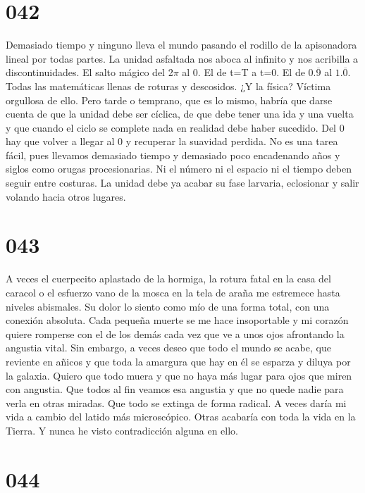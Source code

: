\documentclass[a4paper,11pt,openright,twocolumn]{book}
\begin{document}
\section*{042}

Demasiado tiempo y ninguno lleva el mundo pasando el rodillo de la apisonadora lineal por todas partes. La unidad asfaltada nos aboca al infinito y nos acribilla a discontinuidades. El salto mágico del 2\(\pi\) al 0. El de t=T a t=0. El de \(0.\overline{9}\) al \(1.\overline{0}\). Todas las matemáticas llenas de roturas y descosidos. ¿Y la física? Víctima orgullosa de ello. Pero tarde o temprano, que es lo mismo, habría que darse cuenta de que la unidad debe ser cíclica, de que debe tener una ida y una vuelta y que cuando el ciclo se complete nada en realidad debe haber sucedido. Del 0 hay que volver a llegar al 0 y recuperar la suavidad perdida. No es una tarea fácil, pues llevamos demasiado tiempo y demasiado poco encadenando años y siglos como orugas procesionarias. Ni el número ni el espacio ni el tiempo deben seguir entre costuras. La unidad debe ya acabar su fase larvaria, eclosionar y salir volando hacia otros lugares.

\section*{043}

A veces el cuerpecito aplastado de la hormiga, la rotura fatal en la casa del caracol o el esfuerzo vano de la mosca en la tela de araña me estremece hasta niveles abismales. Su dolor lo siento como mío de una forma total, con una conexión absoluta. Cada pequeña muerte se me hace insoportable y mi corazón quiere romperse con el de los demás cada vez que ve a unos ojos afrontando la angustia vital. Sin embargo, a veces deseo que todo el mundo se acabe, que reviente en añicos y que toda la amargura que hay en él se esparza y diluya por la galaxia. Quiero que todo muera y que no haya más lugar para ojos que miren con angustia. Que todos al fin veamos esa angustia y que no quede nadie para verla en otras miradas. Que todo se extinga de forma radical. A veces daría mi vida a cambio del latido más microscópico. Otras acabaría con toda la vida en la Tierra. Y nunca he visto contradicción alguna en ello.

\section*{044}
\end{document}
